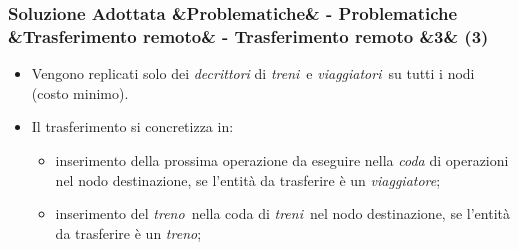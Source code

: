 \documentclass[slidestop,compress,blackandwhite]{beamer}
\newcommand{\ii}[1]{\textit{#1}}
\newcommand{\treno}{\ii{treno}}
\newcommand{\treni}{\ii{treni}}
\newcommand{\viaggiatore}{\ii{viaggiatore}}
\newcommand{\viaggiatori}{\ii{viaggiatori}}
\newcommand{\newtitle}[4]{
	#1 
	\ifx&#2&%
	\else
  		\large- #2
	\fi
	\ifx&#3&%
	\else
  		\normalsize- #3
	\fi
	\ifx&#4&%
	\else
  		\normalsize (#4)
	\fi
}
\newcommand{\newframe}[5]{
	\begin{frame}
		\frametitle{\newtitle{#1}{#2}{#3}{#4}}
		#5
	\end{frame}
}
\newcommand{\myitemize}[1]{\begin{itemize}#1\end{itemize}}
\begin{document}
	\newframe{Soluzione Adottata}{Problematiche}{Trasferimento remoto}{3}{
		\vspace{0.5cm}
		\myitemize{
			\item Vengono replicati solo dei \ii{decrittori} di \treni~e \viaggiatori~su tutti i nodi (costo minimo).
			\item Il trasferimento si concretizza in: 
				\myitemize{
					\item inserimento della prossima operazione da eseguire nella \ii{coda} di operazioni nel nodo destinazione, se l'entità da trasferire è un \viaggiatore;
					\item inserimento del \treno~nella coda di \treni~nel nodo destinazione, se l'entità da trasferire è un \treno;
				}
		}
		
	}
		
\end{document}
